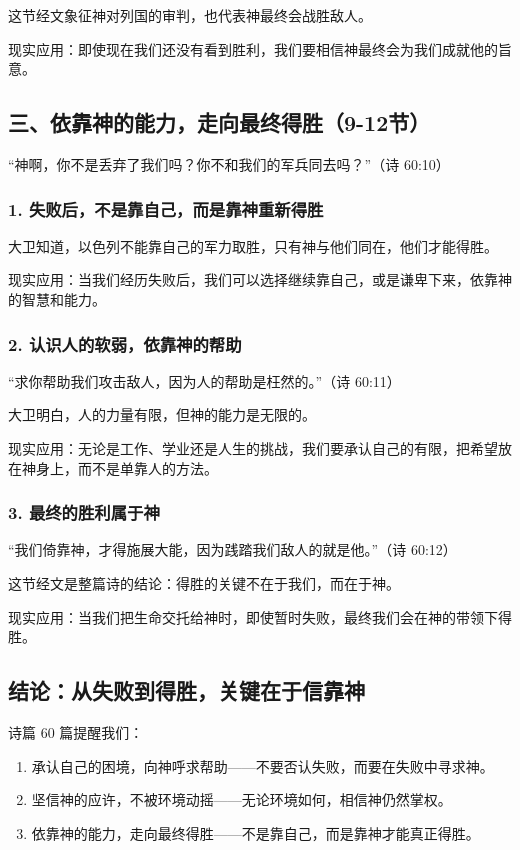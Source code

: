 \documentclass[a4paper, 12pt]{article}
\begin{document}
这节经文象征神对列国的审判，也代表神最终会战胜敌人。

现实应用：即使现在我们还没有看到胜利，我们要相信神最终会为我们成就他的旨意。
\subsection*{三、依靠神的能力，走向最终得胜（9-12节）}
“神啊，你不是丢弃了我们吗？你不和我们的军兵同去吗？”（诗 60:10）

\subsubsection*{1. 失败后，不是靠自己，而是靠神重新得胜}
\hspace{0.6cm}大卫知道，以色列不能靠自己的军力取胜，只有神与他们同在，他们才能得胜。

现实应用：当我们经历失败后，我们可以选择继续靠自己，或是谦卑下来，依靠神的智慧和能力。
\subsubsection*{2. 认识人的软弱，依靠神的帮助}
“求你帮助我们攻击敌人，因为人的帮助是枉然的。”（诗 60:11）

大卫明白，人的力量有限，但神的能力是无限的。

现实应用：无论是工作、学业还是人生的挑战，我们要承认自己的有限，把希望放在神身上，而不是单靠人的方法。
\subsubsection*{3. 最终的胜利属于神}
“我们倚靠神，才得施展大能，因为践踏我们敌人的就是他。”（诗 60:12）

这节经文是整篇诗的结论：得胜的关键不在于我们，而在于神。

现实应用：当我们把生命交托给神时，即使暂时失败，最终我们会在神的带领下得胜。
\subsection*{结论：从失败到得胜，关键在于信靠神}
诗篇 60 篇提醒我们：
\begin{enumerate}
    \item 承认自己的困境，向神呼求帮助——不要否认失败，而要在失败中寻求神。
    \item 坚信神的应许，不被环境动摇——无论环境如何，相信神仍然掌权。

    \item 依靠神的能力，走向最终得胜——不是靠自己，而是靠神才能真正得胜。

\end{enumerate}
\end{document}
